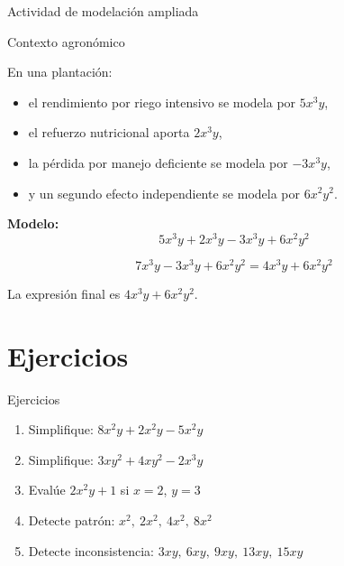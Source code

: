 \documentclass[handout,aspectratio=169,12pt]{beamer}
\newcommand{\Agronomia}[1]{
	\begin{exampleblock}{Contexto agronómico}
		#1
	\end{exampleblock}
}
\begin{document}
	\begin{frame}{Actividad de modelación ampliada}
		\Agronomia{
			En una plantación:
			\begin{itemize}
				\item el rendimiento por riego intensivo se modela por \(5x^3y\),
				\pause
				\item el refuerzo nutricional aporta \(2x^3y\),
				\pause
				\item la pérdida por manejo deficiente se modela por \(-3x^3y\),
				\pause
				\item y un segundo efecto independiente se modela por \(6x^2y^2\).
			\end{itemize}
		}
		
		\pause
		\textbf{Modelo:}
		\[
		5x^3y + 2x^3y - 3x^3y + 6x^2y^2
		\]
		
		\pause
		\[
		7x^3y - 3x^3y + 6x^2y^2 =4x^3y + 6x^2y^2
		\]
		
		\pause
		La expresión final es \(4x^3y + 6x^2y^2\).
		\end{frame}
	
	\section{Ejercicios}
	\begin{frame}{Ejercicios}
		\begin{enumerate}[<+->]
			\item Simplifique: \(8x^2y + 2x^2y - 5x^2y\)
			\item Simplifique: \(3xy^2 + 4xy^2 - 2x^3y\)
			\item Evalúe \(2x^2y + 1\) si \(x=2\), \(y=3\)
			\item Detecte patrón: \(x^2,\ 2x^2,\ 4x^2,\ 8x^2\)
			\item Detecte inconsistencia: \(3xy,\ 6xy,\ 9xy,\ 13xy,\ 15xy\)
		\end{enumerate}
	\end{frame}
	
\end{document}

